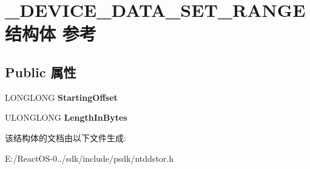 \hypertarget{struct___d_e_v_i_c_e___d_a_t_a___s_e_t___r_a_n_g_e}{}\section{\+\_\+\+D\+E\+V\+I\+C\+E\+\_\+\+D\+A\+T\+A\+\_\+\+S\+E\+T\+\_\+\+R\+A\+N\+G\+E结构体 参考}
\label{struct___d_e_v_i_c_e___d_a_t_a___s_e_t___r_a_n_g_e}
\subsection*{Public 属性}
\begin{DoxyCompactItemize}
\item 
\mbox{\label{struct___d_e_v_i_c_e___d_a_t_a___s_e_t___r_a_n_g_e_af86a7cd48842bab41622302b593c18ea}} 
L\+O\+N\+G\+L\+O\+NG {\bfseries Starting\+Offset}
\item 
\mbox{\label{struct___d_e_v_i_c_e___d_a_t_a___s_e_t___r_a_n_g_e_a656e5cb5b36dfa1114b7b8fb321253e3}} 
U\+L\+O\+N\+G\+L\+O\+NG {\bfseries Length\+In\+Bytes}
\end{DoxyCompactItemize}


该结构体的文档由以下文件生成\+:\begin{DoxyCompactItemize}
\item 
E\+:/\+React\+O\+S-\/0../sdk/include/psdk/ntddstor.\+h\end{DoxyCompactItemize}
